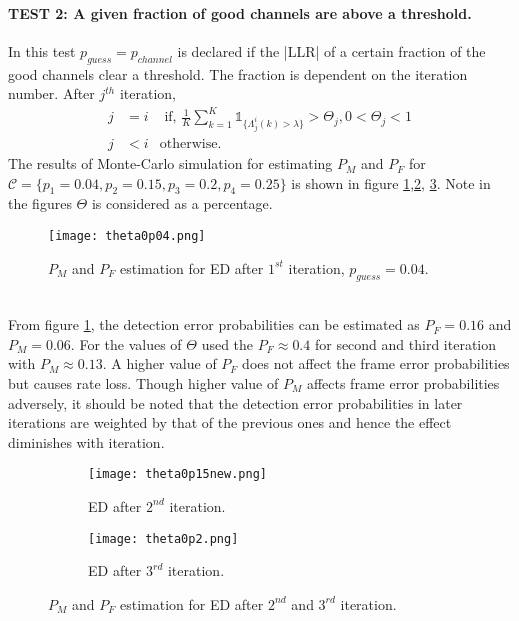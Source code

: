 \documentclass[
11pt, %
a4paper, %
oneside, %
headinclude,footinclude, %
BCOR5mm, %
]{scrartcl}
\begin{document}
\paragraph{TEST 2: A given fraction of good channels are above a threshold.}  
In this test $p_{guess}=p_{channel}$ is declared if the |LLR| of a certain fraction of the good channels clear a threshold. The fraction is dependent on the iteration number. After $j^{th}$ iteration,
\begin{align*}  
j & =i &\text{   if, } \frac{1}{K}\sum^K_{k=1} \mathbb{1}_{\{\Lambda_{j}^i(k) > \lambda\}} > \Theta_j,0<\Theta_j<1 \\
j & < i  &\text{otherwise. }
\end{align*} 
The results of Monte-Carlo simulation for estimating $P_M$ and $P_F$ for $\mathcal{C}=\{p_1=0.04,p_2=0.15,p_3=0.2,p_4=0.25\}$ is shown in figure \ref{fig:theta1},\ref{fig:theta2}, \ref{fig:theta3}. Note in the figures $\Theta$ is considered as a percentage.
\begin{figure}[h]
 \begin{center}
    \texttt{[image: theta0p04.png]}
  \end{center}
  \caption{$P_M$ and $P_F$ estimation for ED after $1^{st}$ iteration, $p_{guess}=0.04$.}
  \label{fig:theta1}
\end{figure}\\
From figure \ref{fig:theta1}, the detection error probabilities can be estimated as $P_F=0.16$ and $P_M=0.06$. For the values of $\Theta$ used the $P_F\approx0.4$  for second and third iteration with $P_M\approx0.13$. A higher value of $P_F$ does not affect the frame error probabilities but causes rate loss. Though higher value of $P_M$ affects frame error probabilities adversely, it should be noted that the detection error probabilities in later iterations are weighted by that of the previous ones and hence the effect diminishes with iteration.
\begin{figure}[h]
\centering
\begin{subfigure}{.5\textwidth}
    \centering
    \texttt{[image: theta0p15new.png]}
    \caption{ED after $2^{nd}$ iteration.}
    \label{fig:theta2}
\end{subfigure}%
\begin{subfigure}{.5\textwidth}
    \centering
    \texttt{[image: theta0p2.png]}
    \caption{ED after $3^{rd}$ iteration.}
    \label{fig:theta3}
\end{subfigure}
\caption{$P_M$ and $P_F$ estimation for ED after $2^{nd}$ and $3^{rd}$ iteration.}
\label{fig:theta23}
\end{figure}
\end{document}
